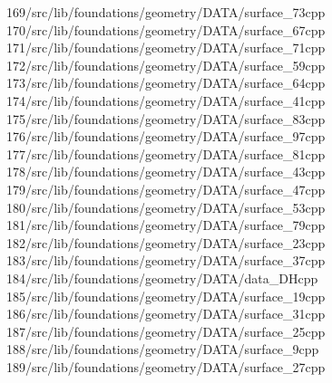 \begin{tabbing}
169\>/src/lib/foundations/geometry/DATA/surface\_73cpp\\[0pt]
170\>/src/lib/foundations/geometry/DATA/surface\_67cpp\\[0pt]
171\>/src/lib/foundations/geometry/DATA/surface\_71cpp\\[0pt]
172\>/src/lib/foundations/geometry/DATA/surface\_59cpp\\[0pt]
173\>/src/lib/foundations/geometry/DATA/surface\_64cpp\\[0pt]
174\>/src/lib/foundations/geometry/DATA/surface\_41cpp\\[0pt]
175\>/src/lib/foundations/geometry/DATA/surface\_83cpp\\[0pt]
176\>/src/lib/foundations/geometry/DATA/surface\_97cpp\\[0pt]
177\>/src/lib/foundations/geometry/DATA/surface\_81cpp\\[0pt]
178\>/src/lib/foundations/geometry/DATA/surface\_43cpp\\[0pt]
179\>/src/lib/foundations/geometry/DATA/surface\_47cpp\\[0pt]
180\>/src/lib/foundations/geometry/DATA/surface\_53cpp\\[0pt]
181\>/src/lib/foundations/geometry/DATA/surface\_79cpp\\[0pt]
182\>/src/lib/foundations/geometry/DATA/surface\_23cpp\\[0pt]
183\>/src/lib/foundations/geometry/DATA/surface\_37cpp\\[0pt]
184\>/src/lib/foundations/geometry/DATA/data\_DHcpp\\[0pt]
185\>/src/lib/foundations/geometry/DATA/surface\_19cpp\\[0pt]
186\>/src/lib/foundations/geometry/DATA/surface\_31cpp\\[0pt]
187\>/src/lib/foundations/geometry/DATA/surface\_25cpp\\[0pt]
188\>/src/lib/foundations/geometry/DATA/surface\_9cpp\\[0pt]
189\>/src/lib/foundations/geometry/DATA/surface\_27cpp\\[0pt]

\end{tabbing}
